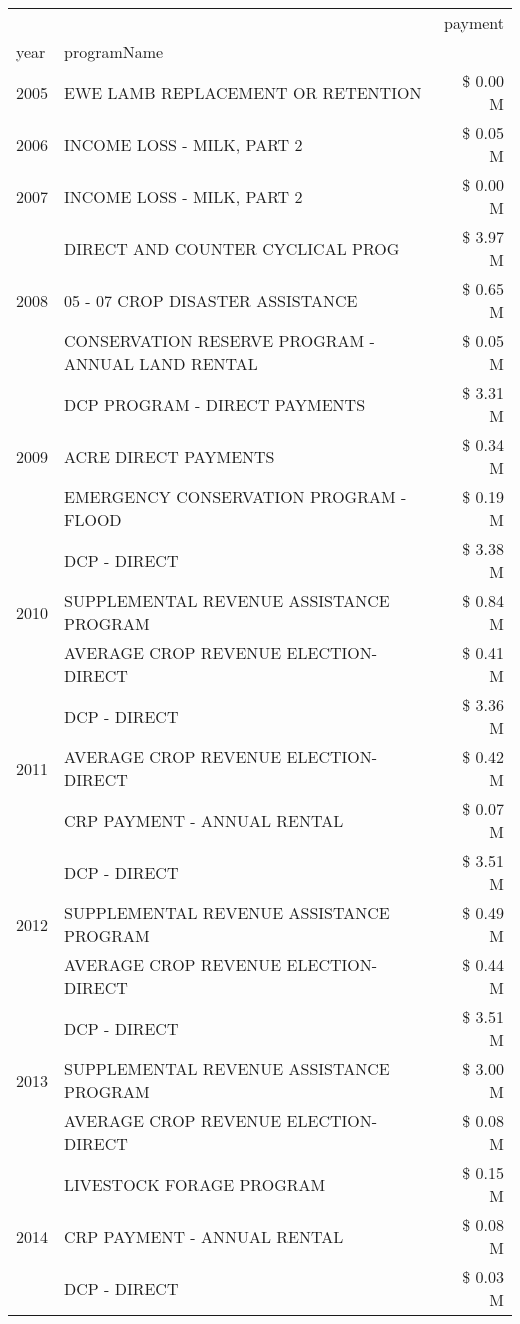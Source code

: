 \begin{tabular}{llr}
\toprule
 &  & payment \\
year & programName &  \\
\midrule
2005 & EWE LAMB REPLACEMENT OR RETENTION & \$ 0.00 M \\
\cline{1-3}
2006 & INCOME LOSS - MILK, PART 2 & \$ 0.05 M \\
\cline{1-3}
2007 & INCOME LOSS - MILK, PART 2 & \$ 0.00 M \\
\cline{1-3}
\multirow[t]{3}{*}{2008} & DIRECT AND COUNTER CYCLICAL PROG & \$ 3.97 M \\
 & 05 - 07 CROP DISASTER ASSISTANCE & \$ 0.65 M \\
 & CONSERVATION RESERVE PROGRAM - ANNUAL LAND RENTAL & \$ 0.05 M \\
\cline{1-3}
\multirow[t]{3}{*}{2009} & DCP PROGRAM - DIRECT PAYMENTS & \$ 3.31 M \\
 & ACRE DIRECT PAYMENTS & \$ 0.34 M \\
 & EMERGENCY CONSERVATION PROGRAM - FLOOD & \$ 0.19 M \\
\cline{1-3}
\multirow[t]{3}{*}{2010} & DCP - DIRECT & \$ 3.38 M \\
 & SUPPLEMENTAL REVENUE ASSISTANCE PROGRAM & \$ 0.84 M \\
 & AVERAGE CROP REVENUE ELECTION-DIRECT & \$ 0.41 M \\
\cline{1-3}
\multirow[t]{3}{*}{2011} & DCP - DIRECT & \$ 3.36 M \\
 & AVERAGE CROP REVENUE ELECTION-DIRECT & \$ 0.42 M \\
 & CRP PAYMENT - ANNUAL RENTAL & \$ 0.07 M \\
\cline{1-3}
\multirow[t]{3}{*}{2012} & DCP - DIRECT & \$ 3.51 M \\
 & SUPPLEMENTAL REVENUE ASSISTANCE PROGRAM & \$ 0.49 M \\
 & AVERAGE CROP REVENUE ELECTION-DIRECT & \$ 0.44 M \\
\cline{1-3}
\multirow[t]{3}{*}{2013} & DCP - DIRECT & \$ 3.51 M \\
 & SUPPLEMENTAL REVENUE ASSISTANCE PROGRAM & \$ 3.00 M \\
 & AVERAGE CROP REVENUE ELECTION-DIRECT & \$ 0.08 M \\
\cline{1-3}
\multirow[t]{3}{*}{2014} & LIVESTOCK FORAGE PROGRAM & \$ 0.15 M \\
 & CRP PAYMENT - ANNUAL RENTAL & \$ 0.08 M \\
 & DCP - DIRECT & \$ 0.03 M \\
\cline{1-3}

\end{tabular}
